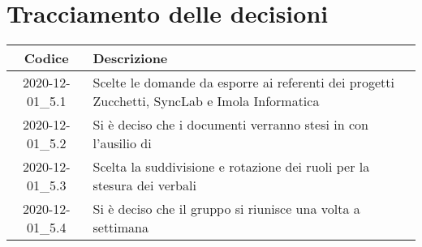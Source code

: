 \section*{Tracciamento delle decisioni}

\begin{center}
	\begin{longtable}{|c|p{12.25cm}|}
		\hline
		\rowcolor{lighter-grayer}
		\textbf{Codice} & \textbf{Descrizione} \\
		\hline
		\endfirsthead

		\hline
		2020-12-01\_5.1 & Scelte le domande da esporre ai referenti dei progetti Zucchetti, SyncLab e Imola Informatica \\
		\hline
		2020-12-01\_5.2 & Si è deciso che i documenti verranno stesi in \glock{\LaTeX} con l'ausilio di \glock{GitHub} \\
		\hline
		2020-12-01\_5.3 & Scelta la suddivisione e rotazione dei ruoli per la stesura dei verbali \\
		\hline
		2020-12-01\_5.4 & Si è deciso che il gruppo si riunisce una volta a settimana \\
		\hline

	\end{longtable}
\end{center}
